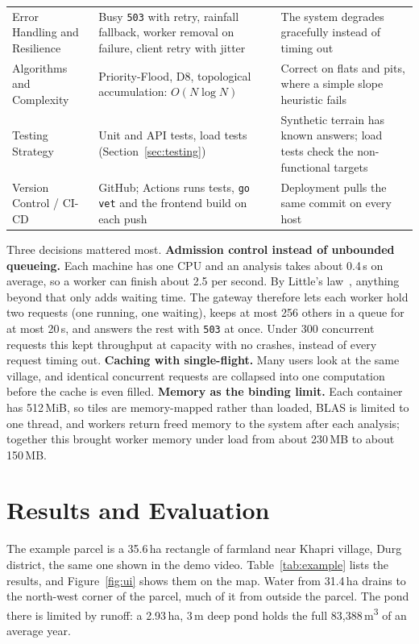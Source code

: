 \documentclass[manuscript,screen,review]{acmart}
\begin{document}
\begin{table}[t]
\begin{tabular}{L{2.6cm}L{5.0cm}L{6.3cm}}
    Error Handling and Resilience & Busy \texttt{503} with retry, rainfall fallback, worker removal on failure, client retry with jitter & The system degrades gracefully instead of timing out \\
    Algorithms and Complexity & Priority-Flood, D8, topological accumulation: $O(N\log N)$ & Correct on flats and pits, where a simple slope heuristic fails \\
    Testing Strategy & Unit and API tests, load tests (Section~\ref{sec:testing}) & Synthetic terrain has known answers; load tests check the non-functional targets \\
    Version Control / CI-CD & GitHub; Actions runs tests, \texttt{go vet} and the frontend build on each push & Deployment pulls the same commit on every host \\
    \bottomrule
  \end{tabular}
\end{table}

Three decisions mattered most. \textbf{Admission control instead of unbounded queueing.} Each
machine has one CPU and an analysis takes about 0.4\,s on average, so a worker can finish about
2.5 per second. By Little's law~\cite{harcholbalter2013}, anything beyond that only adds waiting
time. The gateway therefore lets each worker hold two requests (one running, one waiting), keeps
at most 256 others in a queue for at most 20\,s, and answers the rest with \texttt{503} at once.
Under 300 concurrent requests this kept throughput at capacity with no crashes, instead of every
request timing out. \textbf{Caching with single-flight.} Many users look at the same village, and
identical concurrent requests are collapsed into one computation before the cache is even filled.
\textbf{Memory as the binding limit.} Each container has 512\,MiB, so tiles are memory-mapped
rather than loaded, BLAS is limited to one thread, and workers return freed memory to the system
after each analysis; together this brought worker memory under load from about 230\,MB to about
150\,MB.

\section{Results and Evaluation}
\label{sec:results}
The example parcel is a 35.6\,ha rectangle of farmland near Khapri village, Durg district, the
same one shown in the demo video. Table~\ref{tab:example} lists the results, and
Figure~\ref{fig:ui} shows them on the map. Water from 31.4\,ha drains to the north-west corner of
the parcel, much of it from outside the parcel. The pond there is limited by runoff: a 2.93\,ha,
3\,m deep pond holds the full 83{,}388\,m\textsuperscript{3} of an average year.
\end{document}
